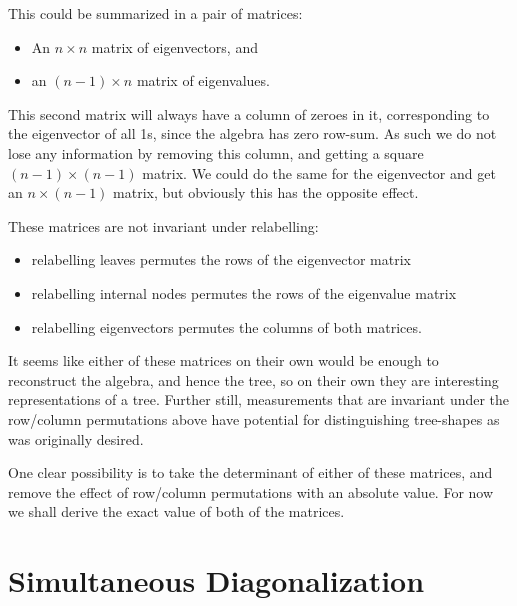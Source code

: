 \documentclass{report}
\begin{document}
This could be summarized in a pair of matrices:
\begin{itemize}
	\item An $n \times n$ matrix of eigenvectors, and
	\item an $(n-1) \times n$ matrix of eigenvalues.
\end{itemize}

This second matrix will always have a column of zeroes in it, corresponding to
the eigenvector of all 1s, since the algebra has zero row-sum.
As such we do not lose any information by removing this column, and getting a
square $(n-1) \times (n-1)$ matrix.
We could do the same for the eigenvector and get an $n \times (n-1)$ matrix,
but obviously this has the opposite effect.

These matrices are not invariant under relabelling:
\begin{itemize}
	\item relabelling leaves permutes the rows of the eigenvector matrix
	\item relabelling internal nodes permutes the rows of the eigenvalue matrix
	\item relabelling eigenvectors permutes the columns of both matrices.
\end{itemize}

It seems like either of these matrices on their own would be enough to
reconstruct the algebra, and hence the tree, so on their own they are
interesting representations of a tree.
Further still, measurements that are invariant under the row/column
permutations above have potential for distinguishing tree-shapes as was
originally desired.

One clear possibility is to take the determinant of either of these matrices,
and remove the effect of row/column permutations with an absolute value.
For now we shall derive the exact value of both of the matrices.


\section{Simultaneous Diagonalization}

%
%
%
%
\end{document}
